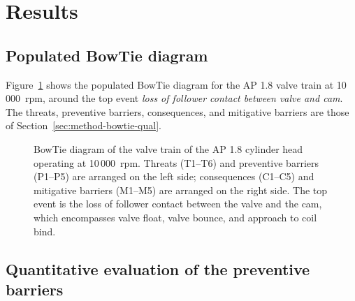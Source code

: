 
\section{Results}\label{sec:results}

\subsection{Populated BowTie diagram}\label{sec:res-bowtie}

Figure~\ref{fig:bowtie} shows the populated BowTie diagram for the AP
1.8 valve train at 10\,000~rpm, around the top event \emph{loss of
follower contact between valve and cam}. The threats, preventive
barriers, consequences, and mitigative barriers are those of
Section~\ref{sec:method-bowtie-qual}.


\begin{figure}[!htbp]
  \centering
  \resizebox{\textwidth}{!}{}
  \caption{BowTie diagram of the valve train of the AP 1.8 cylinder head operating at 10\,000~rpm. Threats (T1--T6) and preventive barriers (P1--P5) are arranged on the left side; consequences (C1--C5) and mitigative barriers (M1--M5) are arranged on the right side. The top event is the loss of follower contact between the valve and the cam, which encompasses valve float, valve bounce, and approach to coil bind.}\label{fig:bowtie}
\end{figure}

\subsection{Quantitative evaluation of the preventive barriers}
\label{sec:res-quant}

